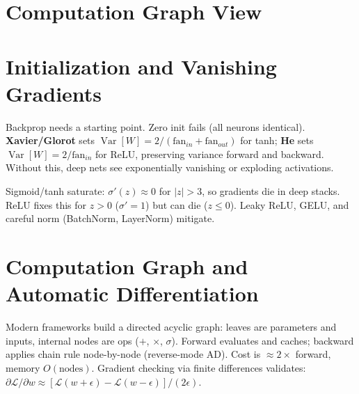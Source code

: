 \section{Computation Graph View}
\begin{center}
\end{center}

\section{Initialization and Vanishing Gradients}
Backprop needs a starting point. Zero init fails (all neurons identical).
\textbf{Xavier/Glorot} sets $\operatorname{Var}[W]=2/(\text{fan}_{in}+\text{fan}_{out})$
for tanh; \textbf{He} sets $\operatorname{Var}[W]=2/\text{fan}_{in}$ for ReLU,
preserving variance forward and backward. Without this, deep nets see
exponentially vanishing or exploding activations.

Sigmoid/tanh saturate: $\sigma'(z)\approx0$ for $|z|>3$, so gradients die in
deep stacks. ReLU fixes this for $z>0$ ($\sigma'=1$) but can die ($z\le0$).
Leaky ReLU, GELU, and careful norm (BatchNorm, LayerNorm) mitigate.

\section{Computation Graph and Automatic Differentiation}
Modern frameworks build a directed acyclic graph: leaves are parameters and
inputs, internal nodes are ops ($+$, $\times$, $\sigma$). Forward evaluates and
caches; backward applies chain rule node-by-node (reverse-mode AD). Cost is
$\approx2\times$ forward, memory $O(\text{nodes})$. Gradient checking via finite
differences validates: $\partial\mathcal{L}/\partial w\approx[\mathcal{L}(w+\epsilon)-\mathcal{L}(w-\epsilon)]/(2\epsilon)$.

